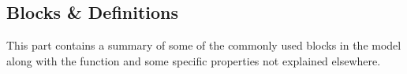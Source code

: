 \subsection{Blocks \& Definitions}

This part contains a summary of some of the commonly used blocks in the model along with the function and some specific properties not explained elsewhere.


